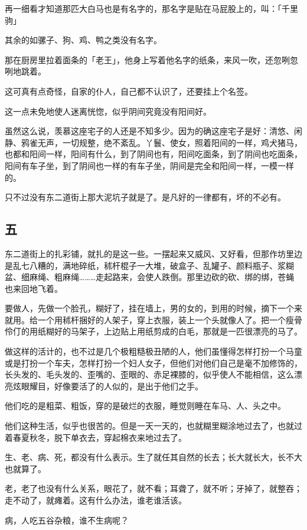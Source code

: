 \documentclass[UTF8]{ctexart}
\begin{document}
再一细看才知道那匹大白马也是有名字的，那名字是贴在马屁股上的，叫：「千里驹」

其余的如骡子、狗、鸡、鸭之类没有名字。

那在厨房里拉着面条的「老王」，他身上写着他名字的纸条，来风一吹，还忽咧忽咧地跳着。

这可真有点奇怪，自家的仆人，自己都不认识了，还要挂上个名签。

这一点未免地使人迷离恍惚，似乎阴间究竟没有阳间好。

虽然这么说，羡慕这座宅子的人还是不知多少。因为的确这座宅子是好：清悠、闲静、鸦雀无声，一切规整，绝不紊乱。丫鬟、使女，照着阳间的一样，鸡犬猪马，也都和阳间一样，阳间有什么，到了阴间也有，阳间吃面条，到了阴间也吃面条，阳间有车子坐，到了阴间也一样的有车子坐，阴间是完全和阳间一样，一模一样的。

只不过没有东二道街上那大泥坑子就是了。是凡好的一律都有，坏的不必有。

\subsection{五}

东二道街上的扎彩铺，就扎的是这一些。一摆起来又威风、又好看，但那作坊里边是乱七八糟的，满地碎纸，秫杆棍子一大堆，破盒子、乱罐子、颜料瓶子、浆糊盆、细麻绳、粗麻绳………走起路来，会使人跌倒。那里边砍的砍、绑的绑，苍蝇也来回地飞着。

要做人，先做一个脸孔，糊好了，挂在墙上，男的女的，到用的时候，摘下一个来就用。给一个用秫杆捆好的人架子，穿上衣服，装上一个头就像人了。把一个瘦骨伶仃的用纸糊好的马架子，上边贴上用纸剪成的白毛，那就是一匹很漂亮的马了。

做这样的活计的，也不过是几个极粗糙极丑陋的人，他们虽懂得怎样打扮一个马童或是打扮一个车夫，怎样打扮一个妇人女子，但他们对他们自己是毫不加修饰的，长头发的、毛头发的、歪嘴的、歪眼的、赤足裸膝的，似乎使人不能相信，这么漂亮炫眼耀目，好像要活了的人似的，是出于他们之手。

他们吃的是粗菜、粗饭，穿的是破烂的衣服，睡觉则睡在车马、人、头之中。

他们这种生活，似乎也很苦的。但是一天一天的，也就糊里糊涂地过去了，也就过着春夏秋冬，脱下单衣去，穿起棉衣来地过去了。

生、老、病、死，都没有什么表示。生了就任其自然的长去；长大就长大，长不大也就{算了}。

老，老了也没有什么关系，眼花了，就不看；耳聋了，就不听；牙掉了，就整吞；走不动了，就瘫着。这有什么办法，谁老谁活该。

病，人吃五谷杂粮，谁不生病呢？
\end{document}
